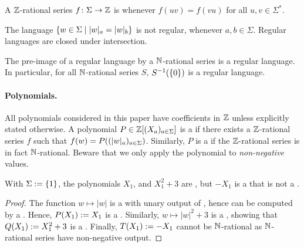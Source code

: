 \documentclass[a4paper,11pt]{article}
\begin{document}
\begin{definition}
    A $\mathbb{Z}$-rational series
    $f \colon \Sigma \to \mathbb{Z}$ is  whenever $f(uv) = f(vu)$ for
    all $u,v \in \Sigma^*$.
\end{definition}

\begin{fact}
    \label{regular:fact}
    The language $\setof{ w \in \Sigma}{ \card[a]{w} = \card[b]{w}}$
    is not regular, whenever $a,b \in \Sigma$.
    Regular languages are closed under intersection.
\end{fact}

\begin{fact}
    \label{pre-image-regular:fact}
    The pre-image of a regular language by a $\mathbb{N}$-rational series
    is a regular language. In particular,
    for all $\mathbb{N}$-rational series $S$, $S^{-1}(\mathopen{\{} 0 \mathclose{\}})$ is a regular
    language.
\end{fact}



\AP \paragraph*{Polynomials.} All polynomials considered in this paper have
coefficients in $\mathbb{Z}$ unless explicitly stated otherwise. A polynomial $P \in
\mathbb{Z}[(X_a)_{a \in \Sigma}]$ is a  if
there exists a  $\mathbb{Z}$-rational series $f$ such that $f(w)
= P(\seqof{ \card[a]{w} }{a \in \Sigma})$. Similarly, $P$ is a
 if the  $\mathbb{Z}$-rational
series is in fact $\mathbb{N}$-rational. Beware that we only apply the polynomial
to \emph{non-negative} values.

\begin{example}
    \label{negative-not-nrat:ex}
    With $\Sigma \mathrel{:=} \mathopen{\{} 1 \mathclose{\}}$,
    the polynomials $X_1$, and $X_1^2 + 3$ are ,
    but $- X_1$ is a  that is 
    not a .
\end{example}
\begin{proof}
    The function $w \mapsto |w|$ is a  with unary
    output of , hence  can be computed by a
    . Hence, $P(X_1) \mathrel{:=} X_1$ is
    a . Similarly,
    $w \mapsto |w|^2 + 3$ is a ,
    showing that $Q(X_1) \mathrel{:=} X_1^2 + 3$
    is a .
    Finally, 
    $T(X_1) \mathrel{:=} - X_1$ cannot be $\mathbb{N}$-rational as $\mathbb{N}$-rational series
    have non-negative output.
\end{proof}
\end{document}
